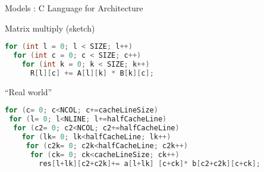 \begin{frame}[fragile]{Models : C Language for Architecture}
      \begin{block}{Matrix multiply (sketch)}\tiny
        \begin{lstlisting}[language=C,basicstyle=\tiny]
for (int l = 0; l < SIZE; l++)
  for (int c = 0; c < SIZE; c++)
    for (int k = 0; k < SIZE; k++)
      R[l][c] += A[l][k] * B[k][c];
        \end{lstlisting}

    \end{block}

    \begin{alertblock}{``Real world''}\tiny
        \begin{lstlisting}[language=C,basicstyle=\tiny]
for (c= 0; c<NCOL; c+=cacheLineSize)
 for (l= 0; l<NLINE; l+=halfCacheLine)
  for (c2= 0; c2<NCOL; c2+=halfCacheLine)
    for (lk= 0; lk<halfCacheLine; lk++)
     for (c2k= 0; c2k<halfCacheLine; c2k++)
      for (ck= 0; ck<cacheLineSize; ck++)
        res[l+lk][c2+c2k]+=	a[l+lk]	[c+ck]*	b[c2+c2k][c+ck];
    \end{lstlisting}
    \end{alertblock}


\end{frame}


